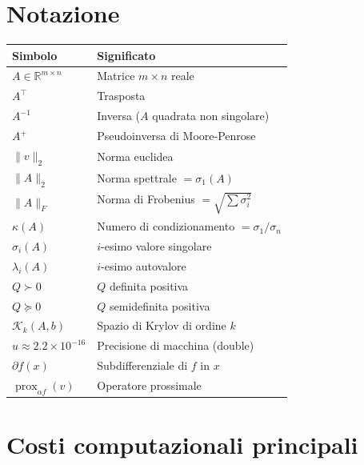 \documentclass[11pt, a4paper, twoside]{book}
\theoremstyle{definition}
\theoremstyle{plain}
\theoremstyle{remark}
\DeclareMathOperator{\prox}{prox}
\newcommand{\R}{\mathbb{R}}
\begin{document}
\section{Notazione}

\begin{center}
\renewcommand{\arraystretch}{1.3}
\begin{tabular}{ll}
\hline
Simbolo & Significato \\
\hline
$A \in \R^{m \times n}$ & Matrice $m \times n$ reale \\
$A^\top$ & Trasposta \\
$A^{-1}$ & Inversa ($A$ quadrata non singolare) \\
$A^+$ & Pseudoinversa di Moore-Penrose \\
$\|v\|_2$ & Norma euclidea \\
$\|A\|_2$ & Norma spettrale $= \sigma_1(A)$ \\
$\|A\|_F$ & Norma di Frobenius $= \sqrt{\sum \sigma_i^2}$ \\
$\kappa(A)$ & Numero di condizionamento $= \sigma_1/\sigma_n$ \\
$\sigma_i(A)$ & $i$-esimo valore singolare \\
$\lambda_i(A)$ & $i$-esimo autovalore \\
$Q \succ 0$ & $Q$ definita positiva \\
$Q \succeq 0$ & $Q$ semidefinita positiva \\
$\mathcal{K}_k(A,b)$ & Spazio di Krylov di ordine $k$ \\
$u \approx 2.2 \times 10^{-16}$ & Precisione di macchina (double) \\
$\partial f(x)$ & Subdifferenziale di $f$ in $x$ \\
$\prox_{\alpha f}(v)$ & Operatore prossimale \\
\hline
\end{tabular}
\end{center}

\section{Costi computazionali principali}
\end{document}
